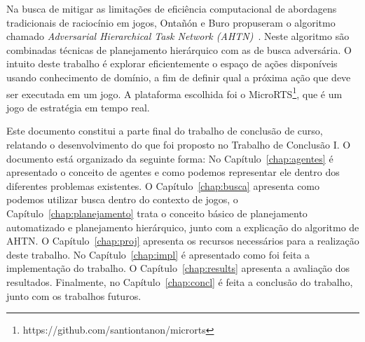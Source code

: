 Na busca de mitigar as limitações de eficiência computacional de abordagens tradicionais de raciocínio em jogos, Ontañón e Buro propuseram o algoritmo chamado \textit{Adversarial Hierarchical Task Network (AHTN)}~\cite{ontanon2015adversarial}. 
Neste algoritmo são combinadas técnicas de planejamento hierárquico com as de busca adversária. 
O intuito deste trabalho é explorar eficientemente o espaço de ações disponíveis usando conhecimento de domínio, a fim de definir qual a próxima ação que deve ser executada em um jogo. 
A plataforma escolhida foi o MicroRTS\footnote{https://github.com/santiontanon/microrts}, que é um jogo de estratégia em tempo real. 

Este documento constitui a parte final do trabalho de conclusão de curso, relatando o desenvolvimento do que foi proposto no Trabalho de Conclusão I. 
O documento está organizado da seguinte forma: No Capítulo~\ref{chap:agentes} é apresentado o conceito de agentes e como podemos representar ele dentro dos diferentes problemas existentes.
O Capítulo~\ref{chap:busca} apresenta como podemos utilizar busca dentro do contexto de jogos, o Capítulo~\ref{chap:planejamento} trata o conceito básico de planejamento automatizado e planejamento hierárquico, junto com a explicação do algoritmo de AHTN. 
O Capítulo~\ref{chap:proj} apresenta os recursos necessários para a realização deste trabalho.
No Capítulo~\ref{chap:impl} é apresentado como foi feita a implementação do trabalho.
O Capítulo~\ref{chap:results} apresenta a avaliação dos resultados.
Finalmente, no Capítulo~\ref{chap:concl} é feita a conclusão do trabalho, junto com os trabalhos futuros.